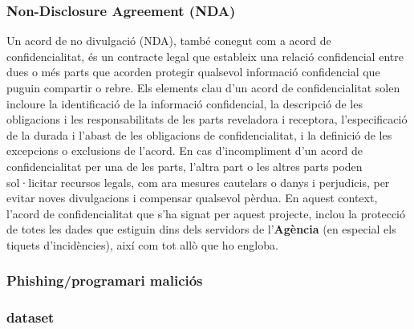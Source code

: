 \subsubsection{Non-Disclosure Agreement (NDA)}
Un acord de no divulgació (NDA), també conegut com a acord de confidencialitat, és un contracte legal que estableix una relació confidencial entre dues o més parts que acorden protegir qualsevol informació confidencial que puguin compartir o rebre.
Els elements clau d'un acord de confidencialitat solen incloure la identificació de la informació confidencial, la descripció de les obligacions i les responsabilitats de les parts reveladora i receptora, l'especificació de la durada i l'abast de les obligacions de confidencialitat, i la definició de les excepcions o exclusions de l'acord. En cas d'incompliment d'un acord de confidencialitat per una de les parts, l'altra part o les altres parts poden sol·licitar recursos legals, com ara mesures cautelars o danys i perjudicis, per evitar noves divulgacions i compensar qualsevol pèrdua.
En aquest context, l'acord de confidencialitat que s'ha signat per aquest projecte, inclou la protecció de totes les dades que estiguin dins dels servidors de l'\textbf{Agència} (en especial els tiquets d'incidències), així com tot allò que ho engloba.\subsubsection{Phishing/programari maliciós}
\subsubsection{dataset}
